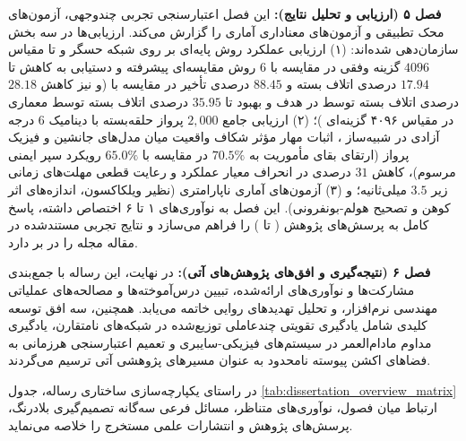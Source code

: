 \documentclass[oneside,openany,phd]{TMU-Thesis}
\begin{document}
\textbf{فصل ۵ (ارزیابی و تحلیل نتایج):} این فصل اعتبارسنجی تجربی چندوجهی، آزمون‌های محک تطبیقی و آزمون‌های معناداری آماری را گزارش می‌کند. ارزیابی‌ها در سه بخش سازمان‌دهی شده‌اند: (۱) ارزیابی عملکرد روش پایه‌ای  بر روی شبکه حسگر  و  تا مقیاس $4096$ گزینه وفقی در مقایسه با $6$ روش مقایسه‌ای پیشرفته و دستیابی به کاهش تا $17.94$ درصدی اتلاف بسته و $88.45$ درصدی تأخیر در مقایسه با  (و نیز کاهش $28.18$ درصدی اتلاف بسته توسط  در هدف  و بهبود تا $35.95$ درصدی اتلاف بسته توسط معماری \rsdrlplus در مقیاس ۴۰۹۶ گزینه‌ای )؛ (۲) ارزیابی جامع $2{,}000$ پرواز حلقه‌بسته با دینامیک $6$ درجه آزادی در شبیه‌ساز ، اثبات مهار مؤثر شکاف واقعیت میان مدل‌های جانشین و فیزیک پرواز (ارتقای بقای مأموریت به $70.5\%$ در مقایسه با $65.0\%$ رویکرد سپر ایمنی مرسوم)، کاهش $31$ درصدی در انحراف معیار عملکرد و رعایت قطعی مهلت‌های زمانی زیر $3.5$ میلی‌ثانیه؛ و (۳) آزمون‌های آماری ناپارامتری (نظیر ویلکاکسون، اندازه‌های اثر کوهن و تصحیح هولم-بونفرونی). این فصل به نوآوری‌های ۱ تا ۶ اختصاص داشته، پاسخ کامل به پرسش‌های پژوهش ( تا ) را فراهم می‌سازد و نتایج تجربی مستندشده در مقاله مجله  \cite{kavianifar2026rsdrl} را در بر دارد.

\textbf{فصل ۶ (نتیجه‌گیری و افق‌های پژوهش‌های آتی):} در نهایت، این رساله با جمع‌بندی مشارکت‌ها و نوآوری‌های ارائه‌شده، تبیین درس‌آموخته‌ها و مصالحه‌های عملیاتی مهندسی نرم‌افزار، و تحلیل تهدیدهای روایی خاتمه می‌یابد. همچنین، سه افق توسعه کلیدی شامل یادگیری تقویتی چندعاملی توزیع‌شده در شبکه‌های نامتقارن، یادگیری مداوم مادام‌العمر در سیستم‌های فیزیکی-سایبری و تعمیم اعتبارسنجی هرزمانی به فضاهای اکشن پیوسته نامحدود به عنوان مسیرهای پژوهشی آتی ترسیم می‌گردند.

در راستای یکپارچه‌سازی ساختاری رساله، جدول \ref{tab:dissertation_overview_matrix} ارتباط میان فصول، نوآوری‌های متناظر، مسائل فرعی سه‌گانه تصمیم‌گیری بلادرنگ، پرسش‌های پژوهش و انتشارات علمی مستخرج را خلاصه می‌نماید.
\end{document}
